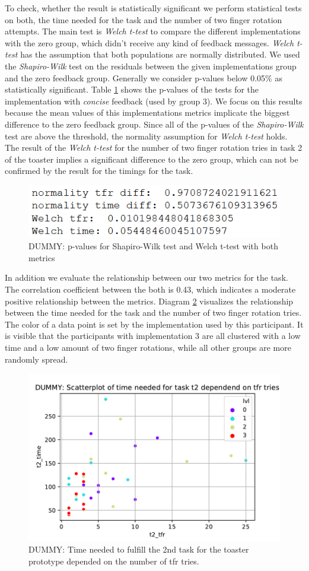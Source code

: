 \documentclass[11pt, a4paper]{article}
\begin{document}
			To check, whether the result is statistically significant we perform statistical tests on both, the time needed for the task and the number of two finger rotation attempts. The main test is \emph{Welch t-test} to compare the different implementations with the zero group, which didn't receive any kind of feedback messages. \emph{Welch t-test} has the assumption that both populations are normally distributed. We used the \emph{Shapiro-Wilk} test on the residuals between the given implementations group and the zero feedback group. Generally we consider p-values below 0.05\% as statistically significant. Table \ref{fig:stats} shows the p-values of the tests for the implementation with \emph{concise} feedback (used by group 3). We focus on this results because the mean values of this implementations metrics implicate the biggest difference to the zero feedback group. Since all of the p-values of the \emph{Shapiro-Wilk} test are above the threshold, the normality assumption for \emph{Welch t-test} holds. The result of the \emph{Welch t-test} for the number of two finger rotation tries in task 2 of the toaster implies a significant difference to the zero group, which can not be confirmed by the result for the timings for the task.

			\begin{figure}[H]
						\centering
						\includegraphics[width=.49\textwidth]{img/stats_table_dummy.png}
						\caption{DUMMY: p-values for Shapiro-Wilk test and Welch t-test with both metrics}
						\label{fig:stats}
					\end{figure}

			In addition we evaluate the relationship between our two metrics for the task. The correlation coefficient between the both is 0.43, which indicates a moderate positive relationship between the metrics. Diagram \ref{fig:scatter} visualizes the relationship between the time needed for the task and the number of two finger rotation tries. The color of a data point is set by the implementation used by this participant. It is visible that the participants with implementation 3 are all clustered with a low time and a low amount of two finger rotations, while all other groups are more randomly spread.

			\begin{figure}[H]
						\centering
						\includegraphics[width=.49\textwidth]{img/plot/plot_scatter.pdf}
						\caption{DUMMY: Time needed to fulfill the 2nd task for the toaster prototype depended on the number of tfr tries.}
						\label{fig:scatter}
					\end{figure}
\end{document}
